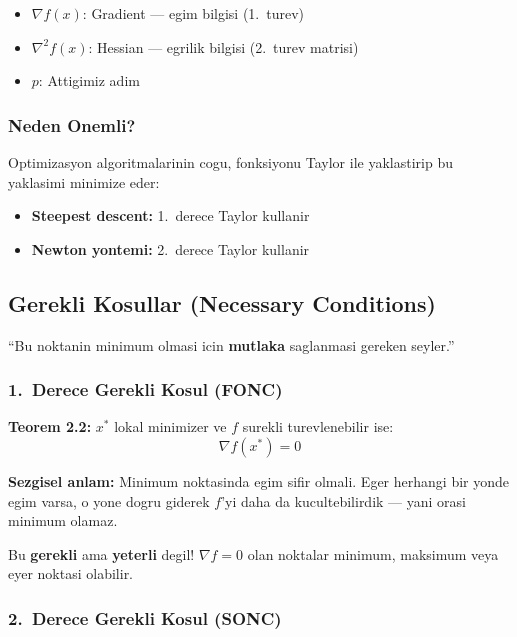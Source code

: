 \documentclass[12pt,a4paper]{article}
\theoremstyle{definition}
\theoremstyle{remark}
\begin{document}
\begin{itemize}[leftmargin=*, itemsep=0.2em]
\item $\nabla f(x)$: Gradient --- egim bilgisi (1.\ turev)
\item $\nabla^2 f(x)$: Hessian --- egrilik bilgisi (2.\ turev matrisi)
\item $p$: Attigimiz adim
\end{itemize}

\subsubsection{Neden Onemli?}

Optimizasyon algoritmalarinin cogu, fonksiyonu Taylor ile yaklastirip bu yaklasimi minimize eder:
\begin{itemize}[leftmargin=*, itemsep=0.2em]
\item \textbf{Steepest descent:} 1.\ derece Taylor kullanir
\item \textbf{Newton yontemi:} 2.\ derece Taylor kullanir
\end{itemize}

\subsection{Gerekli Kosullar (Necessary Conditions)}

``Bu noktanin minimum olmasi icin \textbf{mutlaka} saglanmasi gereken seyler.''

\subsubsection{1.\ Derece Gerekli Kosul (FONC)}

\begin{onemli}
\textbf{Teorem 2.2:} $x^*$ lokal minimizer ve $f$ surekli turevlenebilir ise:
\[
\boxed{\nabla f(x^*) = 0}
\]
\end{onemli}

\textbf{Sezgisel anlam:} Minimum noktasinda egim sifir olmali. Eger herhangi bir yonde egim varsa, o yone dogru giderek $f$'yi daha da kucultebilirdik --- yani orasi minimum olamaz.

\begin{dikkat}
Bu \textbf{gerekli} ama \textbf{yeterli} degil! $\nabla f = 0$ olan noktalar minimum, maksimum veya eyer noktasi olabilir.
\end{dikkat}

\subsubsection{2.\ Derece Gerekli Kosul (SONC)}
\end{document}
